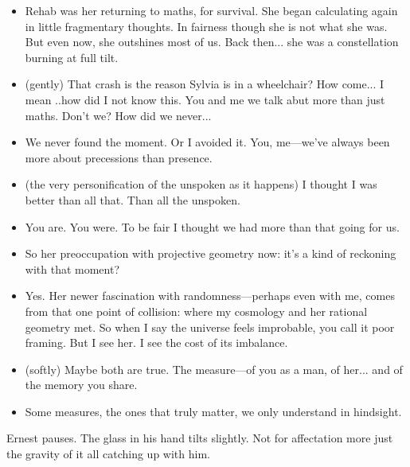 \begin{itemize}[leftmargin=2cm, label={}]

\item[\textbf{Ernest:}]  
Rehab was her returning to maths, for survival.  
She began calculating again in little fragmentary thoughts.  
In fairness though
she is not what she was.  
But even now, she outshines most of us.  
Back then... she was a constellation burning at full tilt.

\item[\textbf{Willard :}] (gently) That crash is the reason Sylvia is in a wheelchair? How come... I mean ..how did I not know this. You and me we talk abut more than just maths. Don’t we?  How did we never...

\item[\textbf{Ernest:}]  
We never found the moment. Or I avoided it. You, me—we’ve always been more about precessions than presence.

\item[\textbf{Willard:}] (the very personification of the unspoken as it happens) 
I thought I was better than all that. Than all the unspoken. 

\item[\textbf{Ernest:}]  
You are. You were. To be fair I thought we had more than that going for us.

\item[\textbf{Willard:}]  
So her preoccupation with projective geometry now: it’s a kind of reckoning with that moment?

\item[\textbf{Ernest:}]  
Yes. Her newer fascination with randomness—perhaps even with me, comes from that one point of collision: where my cosmology and her rational geometry met.  
So when I say the universe feels improbable, you call it poor framing.  
But I see her.  
I see the cost of its imbalance.

\item[\textbf{Willard:}] (softly)
Maybe both are true.  
The measure—of you as a man, of her... and of the memory you share.

\item[\textbf{Ernest:}]  
Some measures,  
the ones that truly matter,   
we only understand in hindsight.
\end{itemize}

Ernest pauses. The glass in his hand tilts slightly. Not for affectation more just the gravity of it all catching up with him.

